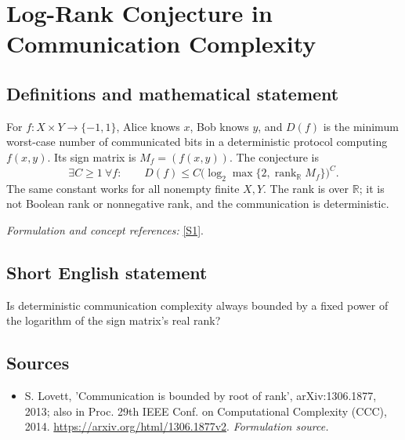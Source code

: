 \documentclass[11pt]{article}
\begin{document}
\section*{\texorpdfstring{Log-Rank Conjecture in Communication Complexity}{Log-Rank Conjecture in Communication Complexity}}\label{144}
\subsection{Definitions and mathematical statement}
For $f:X\times Y\to\{-1,1\}$, Alice knows $x$, Bob knows $y$, and $D(f)$ is the minimum worst-case number of communicated bits in a deterministic protocol computing $f(x,y)$. Its sign matrix is $M_f=(f(x,y))$. The conjecture is
\[
 \exists C\ge1\ \forall f:\qquad
 D(f)\le C\bigl(\log_2\max\{2,\operatorname{rank}_{{\mathbb{R}}}M_f\}\bigr)^C.
\]
The same constant works for all nonempty finite $X,Y$. The rank is over ${\mathbb{R}}$; it is not Boolean rank or nonnegative rank, and the communication is deterministic.
\par\smallskip\textit{Formulation and concept references:} \href{https://arxiv.org/html/1306.1877v2}{[S1]}.

\subsection{Short English statement}
Is deterministic communication complexity always bounded by a fixed power of the logarithm of the sign matrix's real rank?
\subsection{Sources}
\begin{itemize}
\item[S1]S. Lovett, 'Communication is bounded by root of rank', arXiv:1306.1877, 2013; also in Proc. 29th IEEE Conf. on Computational Complexity (CCC), 2014.
\url{https://arxiv.org/html/1306.1877v2}.
\textit{Formulation source.}
\end{itemize}
\end{document}
